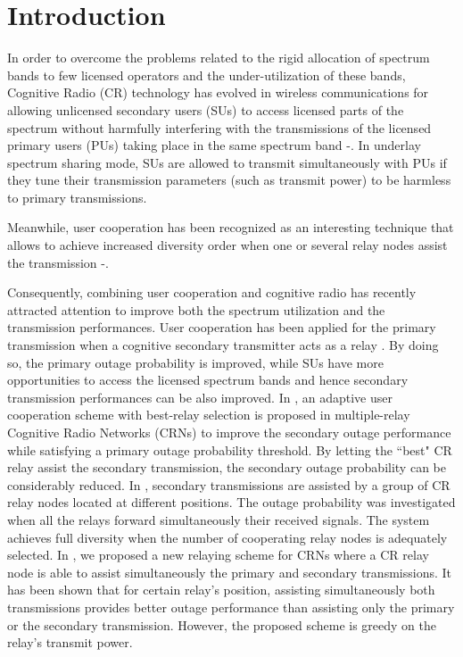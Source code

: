 \documentclass[conference,twocolumn]{IEEEtran}
\begin{document}
\section{Introduction}
In order to overcome the problems related to the rigid allocation of spectrum bands to few licensed operators
and the under-utilization of these bands, Cognitive
Radio (CR) technology has evolved in wireless communications for allowing unlicensed secondary users (SUs) to access licensed parts of the spectrum without harmfully interfering with the transmissions of the licensed primary users (PUs) taking place in the same spectrum band \cite{Mitola}-\cite{Haykin}. In underlay spectrum sharing mode, SUs are allowed to transmit simultaneously with PUs if they tune their transmission parameters (such as
transmit power) to be harmless to primary transmissions. 

Meanwhile, user cooperation has been recognized as an interesting technique that allows to achieve increased diversity order when one or several relay nodes assist the transmission \cite{Laneman1}-\cite{Jaafar_WCM}.

Consequently, combining user cooperation and cognitive radio has
recently attracted attention to improve both the spectrum utilization and
the transmission performances. User cooperation has been applied for the primary transmission when a
cognitive secondary transmitter acts as a relay \cite{Yang_2009}.
By doing so, the primary outage probability is improved, while SUs have more
opportunities to access the licensed spectrum bands and hence secondary transmission performances can be also improved. In
\cite{Zou}, an adaptive user cooperation scheme with best-relay selection is proposed in multiple-relay Cognitive Radio Networks (CRNs) to improve the secondary outage performance while satisfying a primary outage probability threshold. By letting the ``best" CR relay assist the secondary transmission, the secondary outage probability can be considerably reduced.
In \cite{Yener}, secondary transmissions are assisted by a group of CR relay nodes located at different positions. The outage probability was investigated when all the relays forward simultaneously their received signals. The system achieves full diversity when the number of cooperating relay nodes is adequately selected. In \cite{Jaafar_Globecom}, we proposed a new relaying scheme for CRNs where a CR relay node is able to assist
simultaneously the primary and secondary transmissions. It has been shown that for certain relay's position, assisting simultaneously both transmissions provides better outage performance than assisting only the primary or the secondary transmission. However, the proposed scheme is greedy on the relay's transmit power.
\end{document}

